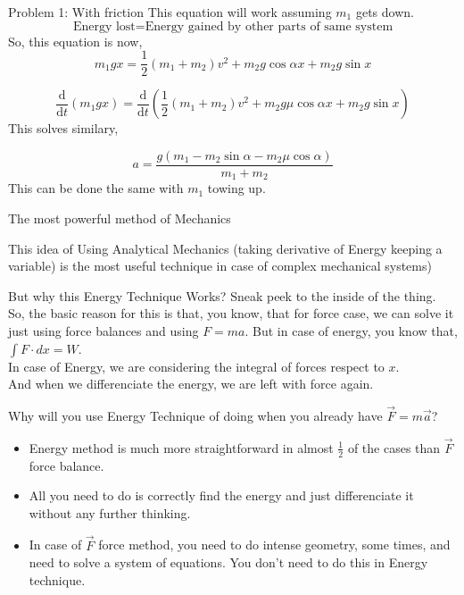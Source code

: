 \documentclass[9pt,serif]{beamer}
\newcommand{\id}[1]{ \begin{idea} #1 \end{idea} }
\begin{document}
\begin{frame}
    {Problem 1: With friction}
This equation will work assuming $m_1$ gets down.    \[ \text{Energy lost} = \text{Energy gained by other parts of same system} \]
So, this equation is now, 
\[ m_1 g x = \frac{1}{2 } \left( m_1 + m_2 \right)  v^2 + m_2 g \cos \alpha x + m_2 g \sin x \]

\[ \frac{\mathrm{d} }{\mathrm{d} t} (m_1 g x) = \frac{\mathrm{d} }{\mathrm{d} t} \left(\frac{1}{2 } \left( m_1 + m_2 \right)  v^2 + m_2 g \mu \cos \alpha x + m_2 g \sin x \right) \]
   This solves similary, 
   
\[ \boxed{a = \frac{g \left( m_1 - m_2 \sin \alpha  - m_2 \mu \cos \alpha \right) }{m_1 + m_2}} \] 
This can be done the same with $m_1$ towing up.
\end{frame}

\begin{frame}
    {The most powerful method of Mechanics}
    \id{This idea of Using Analytical Mechanics (taking derivative of Energy keeping a variable) is the most useful technique in case of complex mechanical systems)}
\end{frame}



\begin{frame}
    {But why this Energy Technique Works?}
    Sneak peek to the inside of the thing. 
    \\
    So, the basic reason for this is that, you know, that for force case, we can solve it just using force balances and using $F=ma$. But in case of energy, 
    you know that, $\int F \cdot dx = W$. 
    \\
    In case of Energy, we are considering the integral of forces respect to $x$. 
    \\
    And when we differenciate the energy, we are left with force again. 
    
\end{frame}
\begin{frame}
    {Why will you use Energy Technique of doing when you already have $\vec F = m \vec a$?
    }
    \begin{itemize}
        \item Energy method is much more straightforward in almost $\frac{1}{2}$ of the cases than $\vec F$ force balance. \pause
        \item All you need to do is correctly find the energy and just differenciate it without any further thinking. \pause
        \item In case of $\vec F$ force method, you need to do intense geometry, some times, and need to solve a system of equations. 
            You don't need to do this in Energy technique.
    \end{itemize}
\end{frame}
 
\end{document}
